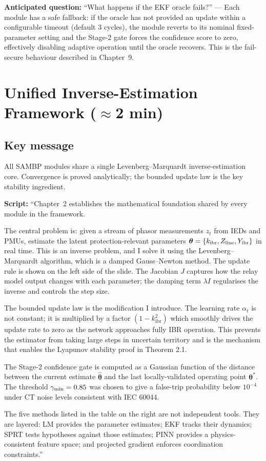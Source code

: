 \documentclass[11pt,a4paper]{article}
\newcommand{\script}[1]{\begin{scriptbox}\textbf{Script:} #1\end{scriptbox}}
\newcommand{\anticipate}[1]{\begin{warnbox}\textbf{Anticipated question:} #1\end{warnbox}}
\newcommand{\kibr}{k_{\mathrm{ibr}}}
\begin{document}
\anticipate{``What happens if the EKF oracle fails?'' ---
Each module has a safe fallback: if the oracle has not provided an update within a
configurable timeout (default 3 cycles), the module reverts to its nominal fixed-parameter
setting and the Stage-2 gate forces the confidence score to zero, effectively disabling
adaptive operation until the oracle recovers. This is the fail-secure behaviour described
in Chapter~9.}

\section{Unified Inverse-Estimation Framework \hfill\normalfont\small($\approx$2 min)}
\label{slide:math}

\subsection*{Key message}
All SAMBP modules share a single Levenberg--Marquardt inverse-estimation core.
Convergence is proved analytically; the bounded update law is the key stability ingredient.

\script{%
``Chapter~2 establishes the mathematical foundation shared by every module in the
framework.

The central problem is: given a stream of phasor measurements $z_t$ from IEDs and PMUs,
estimate the latent protection-relevant parameters $\boldsymbol{\theta} = \{\kibr,
Z_{\rm line}, Y_{\rm ibr}\}$ in real time. This is an inverse problem, and I solve it
using the Levenberg--Marquardt algorithm, which is a damped Gauss--Newton method.
The update rule is shown on the left side of the slide. The Jacobian $J$ captures how
the relay model output changes with each parameter; the damping term $\lambda I$
regularises the inverse and controls the step size.

The bounded update law is the modification I introduce. The learning rate $\alpha_t$ is
not constant; it is multiplied by a factor $(1 - \kibr^2)$ which smoothly drives the
update rate to zero as the network approaches fully IBR operation. This prevents the
estimator from taking large steps in uncertain territory and is the mechanism that enables
the Lyapunov stability proof in Theorem 2.1.

The Stage-2 confidence gate is computed as a Gaussian function of the distance between
the current estimate $\hat{\boldsymbol{\theta}}$ and the last locally-validated operating
point $\boldsymbol{\theta}^*$. The threshold $\gamma_{\rm min} = 0.85$ was chosen to give
a false-trip probability below $10^{-4}$ under CT noise levels consistent with IEC 60044.

The five methods listed in the table on the right are not independent tools. They are
layered: LM provides the parameter estimates; EKF tracks their dynamics; SPRT tests
hypotheses against those estimates; PINN provides a physics-consistent feature space;
and projected gradient enforces coordination constraints.''%
}
\end{document}
